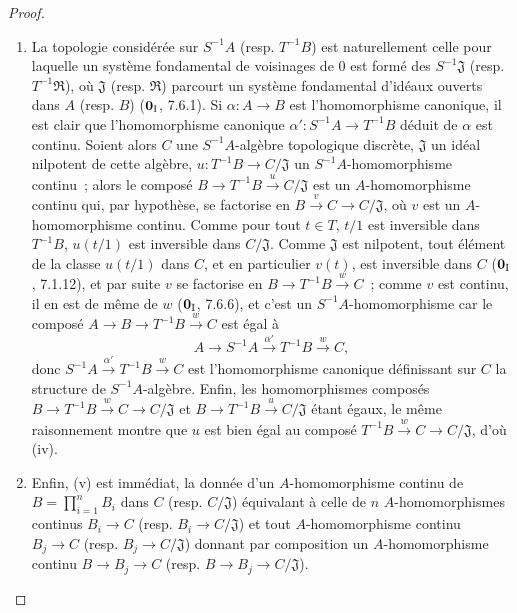 \begin{proof}
\begin{enumerate}
  continu d'anneaux $f:B\otimes_A A'\to C$ tel que
  $v=f\circ\rho$ et $w=f\circ\sigma$ ($\mathbf 0_{\rm I}$, 7.7.6)~;
  comme les homomorphismes composés
  $B\xrightarrow{\rho}B\otimes_A A'\xrightarrow{f}C\to C/\mathfrak J$
  et
  $B\xrightarrow{\rho}B\otimes_A A'\xrightarrow{u}C/\mathfrak J$
  (resp.
  $A'\xrightarrow{\sigma}B\otimes_A A'\xrightarrow{f}C\to C/\mathfrak J$
  et
  $A'\xrightarrow{\sigma}B\otimes_A A'\xrightarrow{u}C/\mathfrak J$)
  sont égaux, on a bien la factorisation
  $u:B\otimes_A A'\xrightarrow{f}C\to C/\mathfrak J$, ce qui établit
  (iii).
  \item[(iv)] La topologie considérée sur $S^{-1}A$ (resp. $T^{-1}B$) est
  naturellement celle pour laquelle un système fondamental de voisinages de
  $0$ est formé des $S^{-1}\mathfrak J$ (resp. $T^{-1}\mathfrak R$), où
  $\mathfrak J$ (resp. $\mathfrak R$) parcourt un système fondamental
  d'idéaux ouverts dans $A$ (resp. $B$) ($\mathbf 0_{\rm I}$, 7.6.1). Si
  $\alpha:A\to B$ est l'homomorphisme canonique, il est clair que
  l'homomorphisme canonique $\alpha':S^{-1}A\to T^{-1}B$ déduit de
  $\alpha$ est continu. Soient alors $C$ une $S^{-1}A$-algèbre topologique
  discrète, $\mathfrak J$ un idéal nilpotent de cette algèbre,
  $u:T^{-1}B\to C/\mathfrak J$ un $S^{-1}A$-homomorphisme continu~; alors
  le composé $B\to T^{-1}B\xrightarrow{u}C/\mathfrak J$ est un
  $A$-homomorphisme continu qui, par hypothèse, se factorise en
  $B\xrightarrow{v}C\to C/\mathfrak J$, où $v$ est un $A$-homomorphisme
  continu. Comme pour tout $t\in T$, $t/1$ est inversible dans $T^{-1}B$,
  $u(t/1)$ est inversible dans $C/\mathfrak J$. Comme $\mathfrak J$ est
  nilpotent, tout élément de la classe $u(t/1)$ dans $C$, et en particulier
  $v(t)$, est inversible dans $C$ ($\mathbf 0_{\rm I}$, 7.1.12), et par suite
  $v$ se factorise en $B\to T^{-1}B\xrightarrow{w}C$~; comme $v$ est
  continu, il en est de même de $w$ ($\mathbf 0_{\rm I}$, 7.6.6), et c'est
  un $S^{-1}A$-homomorphisme car le composé
  $A\to B\to T^{-1}B\xrightarrow{w}C$ est égal à
  \[
    A\to S^{-1}A\xrightarrow{\alpha'}T^{-1}B\xrightarrow{w}C,
  \]
  donc $S^{-1}A\xrightarrow{\alpha'}T^{-1}B\xrightarrow{w}C$ est
  l'homomorphisme canonique définissant sur $C$ la structure de
  $S^{-1}A$-algèbre. Enfin, les homomorphismes composés
  $B\to T^{-1}B\xrightarrow{w}C\to C/\mathfrak J$ et
  $B\to T^{-1}B\xrightarrow{u}C/\mathfrak J$ étant égaux, le même
  raisonnement montre que $u$ est bien égal au composé
  $T^{-1}B\xrightarrow{w}C\to C/\mathfrak J$, d'où (iv).
  \item[(v)] Enfin, (v) est immédiat, la donnée d'un $A$-homomorphisme
  continu de $B=\prod_{i=1}^n B_i$ dans $C$ (resp. $C/\mathfrak J$)
  équivalant à celle de $n$ $A$-homomorphismes continus $B_i\to C$
  (resp. $B_i\to C/\mathfrak J$) et tout $A$-homomorphisme continu
  $B_j\to C$ (resp. $B_j\to C/\mathfrak J$) donnant par composition un
  $A$-homomorphisme continu $B\to B_j\to C$
  (resp. $B\to B_j\to C/\mathfrak J$).
\end{enumerate}
\end{proof}

